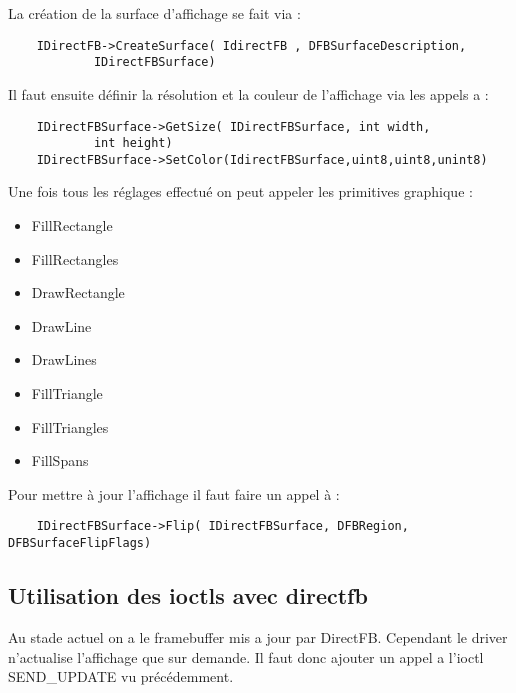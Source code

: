 La création de la surface d'affichage se fait via : 
	\begin{lstlisting}
	IDirectFB->CreateSurface( IdirectFB , DFBSurfaceDescription, 
			IDirectFBSurface)
	\end{lstlisting}

Il faut ensuite définir la résolution et la couleur de l'affichage via les appels a :
	\begin{lstlisting}
	IDirectFBSurface->GetSize( IDirectFBSurface, int width, 
			int height)
	IDirectFBSurface->SetColor(IdirectFBSurface,uint8,uint8,unint8)
	\end{lstlisting}

Une fois tous les réglages effectué on peut appeler les primitives graphique : 
\begin{itemize}
	\item FillRectangle
	\item FillRectangles
	\item DrawRectangle
	\item DrawLine
	\item DrawLines
	\item FillTriangle
	\item FillTriangles
	\item FillSpans
\end{itemize}

Pour mettre à jour l'affichage il faut faire un appel à : 
	\begin{lstlisting}
	IDirectFBSurface->Flip( IDirectFBSurface, DFBRegion, DFBSurfaceFlipFlags)
	\end{lstlisting}




\subsection{Utilisation des ioctls avec directfb}

Au stade actuel on a le framebuffer mis a jour par DirectFB. Cependant le driver n'actualise l'affichage que sur demande.
Il faut donc ajouter un appel a l'ioctl SEND_UPDATE vu précédemment.

